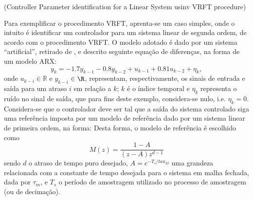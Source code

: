 \begin{exmp}(Controller Parameter identification for a Linear System usinv VRFT procedure)
   \label{exm:31}

   Para exemplificar o procedimento VRFT, aprenta-se um caso simples, onde o intuito é identificar um controlador para um sistema linear de segunda ordem, de acordo com o procedimento VRFT. O modelo adotado é dado por um sistema ``artificial'', retirado de \cite{wei2008}, e descrito seguinte equação de diferenças, na forma de um modelo ARX:
   \begin{equation}
      y_k = -1.7y_{k-1} -0.8y_{k-2} + u_{k-1} + 0.81u_{k-2} + \eta_k,
   \label{eq:sys_ex_1}
   \end{equation}
   onde $u_{k-i} \in \mathbb{R}$ e $y_{k-i}$ $\in \R$, representam, respectivamente, os sinais de entrada e saída para um atraso $i$ em relação a $k$;  $k$ é o índice temporal e $\eta_k$ representa o ruído no sinal de saída, que para fins deste exemplo, considera-se nulo, i.e. $\eta_k=0$.
   Considera-se que o controlador deve ser tal que a saída do sistema controlado siga uma referência imposta por um modelo de referência dado por um sistema linear de primeira ordem, na forma:
   Desta forma, o modelo de referência é escolhido como
   \begin{equation}%
      M(z) = \frac{1-A}{(z-A)z^{d-1}}
   \label{eq:Mz}
   \end{equation}
   sendo $d$ o atraso de tempo puro desejado, $A=e^{-T_s/tau_M}$ uma grandeza relacionada com a constante de tempo desejada para o sistema em malha fechada, dada por $\tau_m$, e $T_s$ o período de amostragem utilizado no processo de amostragem (ou de decimação).
   

\end{exmp}

